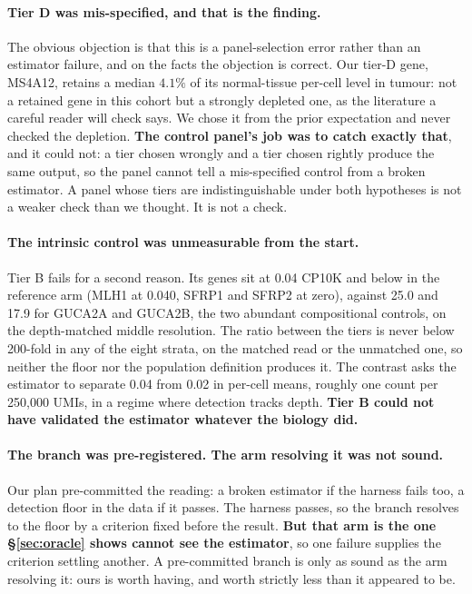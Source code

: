 \documentclass{article}
\begin{document}
\paragraph{Tier D was mis-specified, and that is the finding.} The obvious
objection is that this is a panel-selection error rather than an estimator
failure, and on the facts the objection is correct. Our tier-D gene, MS4A12,
retains a median $4.1\%$ of its normal-tissue per-cell level in tumour: not a
retained gene in this cohort but a strongly depleted one, as the literature a
careful reader will check says. We chose it from the prior expectation and never
checked the depletion. \textbf{The control panel's job was to catch exactly
that}, and it could not: a tier chosen wrongly and a tier chosen rightly produce
the same output, so the panel cannot tell a mis-specified control from a broken
estimator. A panel whose tiers are indistinguishable under both hypotheses is not
a weaker check than we thought. It is not a check.

\paragraph{The intrinsic control was unmeasurable from the start.} Tier B fails
for a second reason. Its genes sit at 0.04 CP10K and below in the reference arm
(MLH1 at 0.040, SFRP1 and SFRP2 at zero), against 25.0 and 17.9 for GUCA2A and
GUCA2B, the two abundant compositional controls, on the depth-matched middle
resolution. The ratio between the tiers is never below 200-fold in any of the
eight strata, on the matched read or the unmatched one, so neither the floor nor
the population definition produces it. The contrast asks the estimator to separate
0.04 from 0.02 in per-cell means, roughly one count per 250{,}000 UMIs, in a
regime where detection tracks depth. \textbf{Tier B could not have validated
the estimator whatever the biology did.}

\paragraph{The branch was pre-registered. The arm resolving it was not sound.}
Our plan pre-committed the reading: a broken estimator if the harness fails too,
a detection floor in the data if it passes. The harness passes, so the branch
resolves to the floor by a criterion fixed before the result. \textbf{But that
arm is the one \S\ref{sec:oracle} shows cannot see the estimator}, so one failure
supplies the criterion settling another. A pre-committed branch is only as sound
as the arm resolving it: ours is worth having, and worth strictly less than it
appeared to be.
\end{document}
